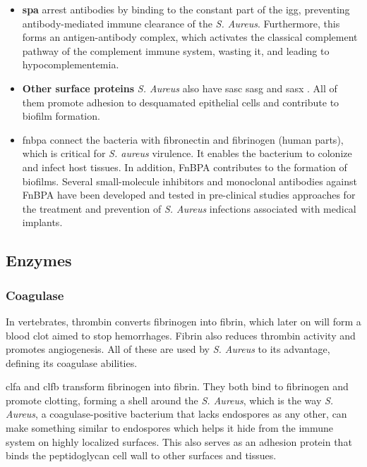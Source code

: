 \begin{itemize}

    \label{stephCellWallSPA}
    \item \textbf{\gls{spa}} arrest antibodies by binding to the constant part of the \gls{igg}, preventing antibody-mediated immune clearance of the \textit{S. Aureus}. Furthermore, this forms an antigen-antibody complex, which activates the classical complement pathway of the complement immune system, wasting it, and leading to hypocomplementemia.

    \item \textbf{Other surface proteins} \textit{S. Aureus} also have \gls{sasc} \cite{Foster2013} \gls{sasg} \cite{Cheng2009} and \gls{sasx} \cite{Josefsson2001}. All of them promote adhesion to desquamated epithelial cells and contribute to biofilm formation.
    
    \item \gls{fnbpa} connect the bacteria with fibronectin and fibrinogen (human parts), which is critical for \textit{S. aureus} virulence. It enables the bacterium to colonize and infect host tissues. In addition, FnBPA contributes to the formation of biofilms. Several small-molecule inhibitors and monoclonal antibodies against FnBPA have been developed and tested in pre-clinical studies approaches for the treatment and prevention of \textit{S. Aureus} infections associated with medical implants.

\end{itemize}

\subsection{Enzymes}

\subsubsection{Coagulase}
\label{stahp:coagulase}

In vertebrates, thrombin converts fibrinogen into fibrin, which later on will form a blood clot aimed to stop hemorrhages. Fibrin also reduces thrombin activity and promotes angiogenesis. All of these are used by \textit{S. Aureus} to its advantage, defining its coagulase abilities.

\gls{clfa} and \gls{clfb} transform fibrinogen into fibrin. They both bind to fibrinogen and promote clotting, forming a shell around the \textit{S. Aureus}, which is the way \textit{S. Aureus}, a coagulase-positive bacterium that lacks endospores as any other, can make something similar to endospores which helps it hide from the immune system on highly localized surfaces. This also serves as an adhesion protein that binds the peptidoglycan cell wall to other surfaces and tissues.

